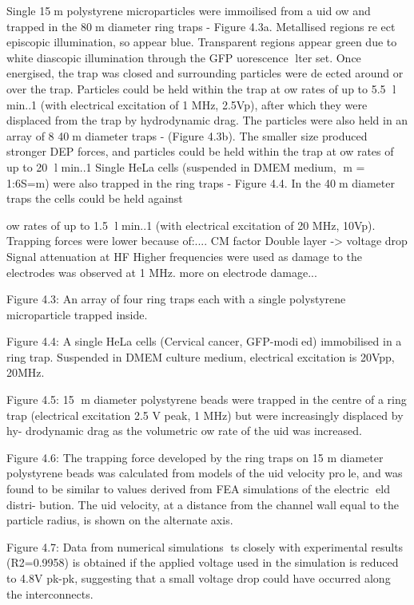 Single 15m polystyrene microparticles were immoilised from a 
uid 
ow and trapped
in the 80m diameter ring traps - Figure 4.3a. Metallised regions re
ect episcopic
illumination, so appear blue. Transparent regions appear green due to white diascopic
illumination through the GFP 
uorescence lter set.
Once energised, the trap was closed and surrounding particles were de
ected around
or over the trap. Particles could be held within the trap at 
ow rates of up to 5.5
l min..1 (with electrical excitation of 1 MHz, 2.5Vp), after which they were displaced
from the trap by hydrodynamic drag. The particles were also held in an array of 8
40m diameter traps - (Figure 4.3b). The smaller size produced stronger DEP forces,
and particles could be held within the trap at 
ow rates of up to 20 l min..1
Single HeLa cells (suspended in DMEM medium, m = 1:6S=m) were also trapped in
the ring traps - Figure 4.4. In the 40m diameter traps the cells could be held against

ow rates of up to 1.5 l min..1 (with electrical excitation of 20 MHz, 10Vp).
Trapping forces were lower because of:.... CM factor Double layer -> voltage drop Signal
attenuation at HF
Higher frequencies were used as damage to the electrodes was observed at 1 MHz. more
on electrode damage...

Figure 4.3: An array of four ring traps each with a single polystyrene microparticle
trapped inside.

Figure 4.4: A single HeLa cells (Cervical cancer, GFP-modied) immobilised in a ring
trap. Suspended in DMEM culture medium, electrical excitation is 20Vpp, 20MHz.

Figure 4.5: 15 m diameter polystyrene beads were trapped in the centre of a ring
trap (electrical excitation 2.5 V peak, 1 MHz) but were increasingly displaced by hy-
drodynamic drag as the volumetric 
ow rate of the 
uid was increased.

Figure 4.6: The trapping force developed by the ring traps on 15 m diameter
polystyrene beads was calculated from models of the 
uid velocity prole, and was
found to be similar to values derived from FEA simulations of the electric eld distri-
bution. The 
uid velocity, at a distance from the channel wall equal to the particle
radius, is shown on the alternate axis.

Figure 4.7: Data from numerical simulations ts closely with experimental results
(R2=0.9958) is obtained if the applied voltage used in the simulation is reduced to 4.8V
pk-pk, suggesting that a small voltage drop could have occurred along the interconnects.


